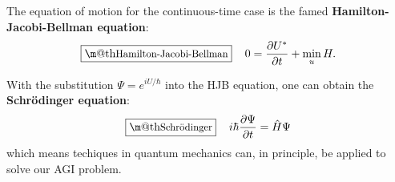 \documentclass[orivec]{llncs}
\makeatletter
\newcommand{\emp}[1]{\textbf{#1}}
\newcommand{\vect}[1]{\boldsymbol{#1}}
\renewcommand{\boxed}[1]{\fbox{\m@th$\displaystyle\scalebox{0.9}{#1}$} \,}
\makeatother
\begin{document}

	
	The equation of motion for the continuous-time case is the famed \emp{Hamilton-Jacobi-Bellman equation}:
	\begin{equation}
	\boxed{\mbox{Hamilton-Jacobi-Bellman}} \quad
	0 = \frac{\partial U^*}{\partial t} + \min_u H .
	\end{equation}
	
	With the substitution $\Psi = e^{i U / \hbar}$ into the HJB equation, one can obtain the
	\emp{Schr\"{o}dinger equation}:
	\begin{equation}
	\boxed{\mbox{Schr\"{o}dinger}} \quad
	i \hbar \frac{\partial \Psi}{\partial t} = \hat{H} \Psi
	\end{equation}
	which means techiques in quantum mechanics can, in principle, be applied to solve our AGI problem.
	


\end{document}
